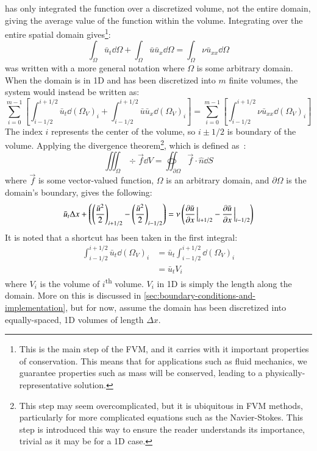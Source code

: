  has only integrated the function over a discretized volume, not the entire domain, giving the average value of the function within the volume.
Integrating over the entire spatial domain gives\footnote{This is the main step of the FVM, and it carries with it important properties of conservation. This means that for applications such as fluid mechanics, we guarantee properties such as mass will be conserved, leading to a physically-representative solution.}:
\begin{equation}
	\label{eq:finite-volume-aribitrary-domain}
	\int_{\Omega}\bar{u}_t \dd \Omega + \int_{\Omega}  \bar{u}\bar{u}_x\dd \Omega = \int_{\Omega}\nu \bar{u}_{xx}\dd \Omega
\end{equation}
 was written with a more general notation where $\Omega$ is some arbitrary domain.
When the domain is in 1D and has been discretized into $m$ finite volumes, the system would instead be written as:
\begin{equation}
	\label{eq:finite-volume-implemented}
	\sum_{i=0}^{m-1} \left[  \int_{i-1/2}^{i+1/2} \bar{u}_t \dd \left(\Omega_V\right)_i+\int_{i-1/2}^{i+1/2} \bar{u}\bar{u}_x \dd \left(\Omega_V\right)_i \right]=\sum_{i=0}^{m-1}\left[ \int_{i-1/2}^{i+1/2} \nu \bar{u}_{xx}\dd \left(\Omega_V\right)_i \right]
\end{equation}
The index $i$ represents the center of the volume, so $i\pm 1/2$ is boundary of the volume.
Applying the divergence theorem\footnote{This step may seem overcomplicated, but it is ubiquitous in FVM methods, particularly for more complicated equations such as the Navier-Stokes. This step is introduced this way to ensure the reader understands its importance, trivial as it may be for a 1D case.}, which is defined as~\autocite{CalculusIIIDivergence}:
\begin{equation}
	\label{eq:divergence-thm}
	\iiint_{\Omega}\div \vec{f}\dd V = \oiint_{\partial \Omega} \vec{f}\cdot \hat{n}\dd S
\end{equation}
where $\vec{f}$ is some vector-valued function, $\Omega$ is an arbitrary domain, and $\partial \Omega$ is the domain's boundary, gives the following:
\begin{equation}
	\label{eq:finite-volume-solution}
	\bar{u}_t \Delta x +\left( \left( \frac{\bar{u}^2}{2}\right)_{i+1/2}-\left( \frac{\bar{u}^2}{2}\right)_{i-1/2} \right)=\nu \left( \pdv{\bar{u}}{x}\eval_{i+1/2}-\pdv{\bar{u}}{x}\eval_{i-1/2} \right)
\end{equation}
It is noted that a shortcut has been taken in the first integral:
\begin{equation*}
	\begin{split}
		\int_{i-1/2}^{i+1/2} \bar{u}_t \dd \left(\Omega_V\right)_i&=\bar{u}_t\int_{i-1/2}^{i+1/2} \dd \left(\Omega_V\right)_i\\
		&=\bar{u}_{t}V_i
	\end{split}
\end{equation*}
where $V_i$ is the volume of $i$\textsuperscript{th} volume.
$V_i$ in 1D is simply the length along the domain.
More on this is discussed in \cref{sec:boundary-conditions-and-implementation}, but for now, assume the domain has been discretized into equally-spaced, 1D volumes of length $\Delta x$.

